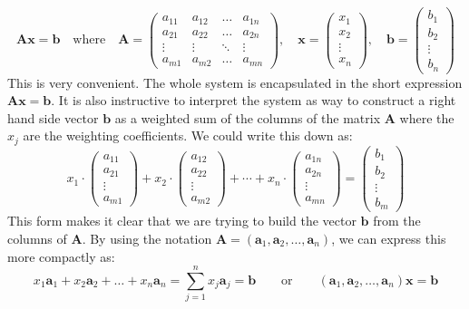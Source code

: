 \begin{equation}
\mathbf{A x} = \mathbf{b} \quad \text{where} \quad
\mathbf{A} = 
\begin{pmatrix}
a_{11} & a_{12} & \ldots & a_{1n} \\
a_{21} & a_{22} & \ldots & a_{2n} \\ 
\vdots & \vdots & \ddots & \vdots \\
a_{m1} & a_{m2} & \ldots & a_{mn} 
\end{pmatrix}, \quad
\mathbf{x} = 
\begin{pmatrix}
x_{1} \\
x_{2} \\ 
\vdots\\
x_{n} 
\end{pmatrix}, \quad
\mathbf{b} = 
\begin{pmatrix}
b_{1} \\
b_{2} \\ 
\vdots\\
b_{n} 
\end{pmatrix}
\end{equation}
This is very convenient. The whole system is encapsulated in the short expression $\mathbf{A x} = \mathbf{b}$. It is also instructive to interpret the system as way to construct a right hand side vector $\mathbf{b}$ as a weighted sum of the columns of the matrix $\mathbf{A}$ where the $x_j$ are the weighting coefficients. We could write this down as:
\begin{equation}
x_1 \cdot \begin{pmatrix} a_{11} \\ a_{21} \\ \vdots \\ a_{m1} \end{pmatrix} + 
x_2 \cdot \begin{pmatrix} a_{12} \\ a_{22} \\ \vdots \\ a_{m2} \end{pmatrix} + 
\cdots +
x_n \cdot \begin{pmatrix} a_{1n} \\ a_{2n} \\ \vdots \\ a_{mn} \end{pmatrix} 
= 
\begin{pmatrix} b_1 \\ b_2 \\ \vdots \\ b_m \end{pmatrix}
\end{equation}
This form makes it clear that we are trying to build the vector $\mathbf{b}$ from the columns of $\mathbf{A}$. By using the notation $\mathbf{A} = (\mathbf{a}_1, \mathbf{a}_2, \ldots, \mathbf{a}_n )$, we can express this more compactly as:
\begin{equation}
 x_1 \mathbf{a}_1 +  x_2 \mathbf{a}_2 + \ldots + x_n \mathbf{a}_n 
 = \sum_{j=1}^{n}  x_j \mathbf{a}_j 
 = \mathbf{b}
 \qquad \text{or} \qquad
 (\mathbf{a}_1, \mathbf{a}_2, \ldots, \mathbf{a}_n ) \mathbf{x} = \mathbf{b}
\end{equation}


